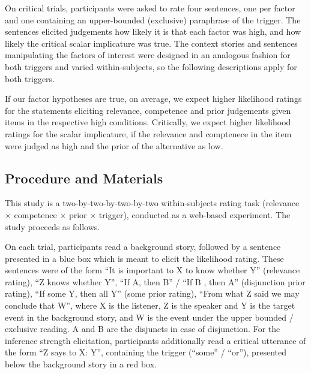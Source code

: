 \documentclass{sp}
\begin{document}
On critical trials, participants were asked to rate four sentences, one per factor and one containing an upper-bounded (exclusive) paraphrase of the trigger. The sentences elicited judgements how likely it is that each factor was high, and how likely the critical scalar implicature was true. The context stories and sentences manipulating the factors of interest were designed in an analogous fashion for both triggers and varied within-subjects, so the following descriptions apply for both triggers.

If our factor hypotheses are true, on average, we expect higher likelihood ratings for the statements eliciting relevance, competence and prior judgements given items in the respective high conditions. Critically, we expect higher likelihood ratings for the scalar implicature, if the relevance and comptenece in the item were judged as high and the prior of the alternative as low.


\subsection{Procedure and Materials}
This study is a two-by-two-by-two-by-two within-subjects rating task (relevance $\times$ competence $\times$ prior $\times$ trigger), conducted as a web-based experiment. The study proceeds as follows.

On each trial, participants read a background story, followed by a sentence presented in a blue box which is meant to elicit the likelihood rating. These sentences were of the form ``It is important to X to know whether Y'' (relevance rating), ``Z knows whether Y'', ``If A, then B'' / ``If B , then A'' (disjunction prior rating), ``If some Y, then all Y'' (some prior rating), ``From what Z said we may conclude that W'', where X is the listener, Z is the speaker and Y is the target event in the background story, and W is the event under the upper bounded / exclusive reading. A and B are the disjuncts in case of disjunction. For the inference strength elicitation, participants additionally read a critical utterance of the form ``Z says to X: Y'', containing the trigger (``some'' / ``or''), presented below the background story in a red box. 
 
\end{document}
